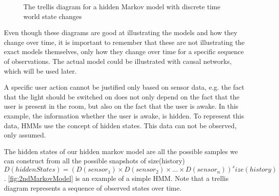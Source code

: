 \begin{figure}[htbp]
\centering
{}
\caption[Trellis diagram for a simple Markov model]{The trellis diagram for a hidden Markov model with discrete time world state changes}\label{fig:1stMarkovModel}
\end{figure}

Even though these diagrams are good at illustrating the models and how they change over time, it is important to remember that these are not illustrating the exact models themselves, only how they change over time for a specific sequence of observations. The actual model could be illustrated with causal networks, which will be used later.

A specific user action cannot be justified only based on sensor data, e.g. the fact that the light should be switched on does not only depend on the fact that the user is present in the room, but also on the fact that the user is awake. In this example, the information whether the user is awake, is hidden. To represent this data, HMMs use the concept of hidden states. This data can not be observed, only assumed.

The hidden states of our hidden markov model are all the possible samples we can construct from all the possible snapshots of size(history) 
$D(hiddenStates) = (D(sensor_1)\times D(sensor_2)\times ... \times D(sensor_n))^size(history)$. \cref{fig:2ndMarkovModel} is an example of a simple HMM. Note that a trellis diagram represents a sequence of observed states over time.


